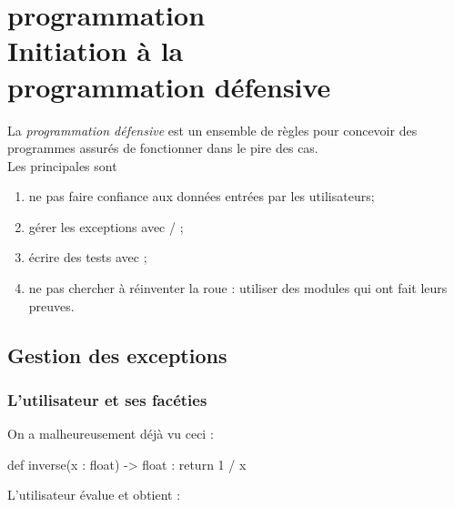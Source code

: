 \documentclass[a4paper,12pt,french]{book}
\begin{document}
\chapter{\large programmation\\[-1em]\fontsize{35pt}{42pt}\selectfont\titlefont Initiation à la\\programmation défensive}

\begin{aretenir}
La \textit{programmation défensive} est un ensemble de règles pour concevoir des programmes assurés de fonctionner dans le pire des cas.\\
Les principales sont
\begin{enumerate}[--]
	\item 	ne pas faire confiance aux données entrées par les utilisateurs;
	\item 	gérer les exceptions avec  / ;
	\item 	écrire des tests avec ;
	\item 	ne pas chercher à réinventer la roue : utiliser des modules qui ont fait leurs preuves.	
\end{enumerate}
\end{aretenir}


\section{Gestion des exceptions}
\subsection{L'utilisateur et ses facéties}
On a malheureusement déjà vu ceci :
\begin{pythoncode}
def inverse(x : float) -> float :
	return 1 / x
\end{pythoncode}
L'utilisateur évalue  et obtient :\\

{\color{red}}\\
\end{document}
